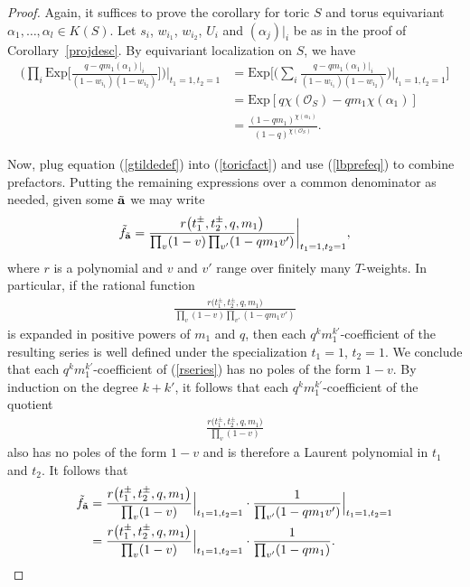 \documentclass[10pt,a4paper]{amsart}
\numberwithin{equation}{section}
\newcommand{\Exp}{\mathrm{Exp}}
\begin{document}
\begin{proof}
Again, it suffices to prove the corollary for toric $S$ and torus equivariant $\alpha_1,\dots,\alpha_l\in K(S)$. Let $s_i$, $w_{i_1}$, $w_{i_2}$, $U_i$ and $(\alpha_j)|_i$ be as in the proof of Corollary~\ref{projdesc}. By equivariant localization on $S$, we have \begin{align}\label{lbprefeq}
\nonumber\bigg(\prod_{i} \Exp\bigg [\frac{q-qm_1(\alpha_1)|_i}{(1-w_{i_1})(1-w_{i_2})}\bigg ] \bigg)\bigg |_{t_1=1,t_2=1}&=\Exp\bigg[\bigg(\sum_i \frac{q-qm_1(\alpha_1)|_i}{(1-w_{i_1})(1-w_{i_2})}\bigg)\bigg |_{t_1=1,t_2=1}\bigg ]
\\
&\nonumber=\Exp[q\chi(\mathcal{O}_S)-qm_1\chi(\alpha_1)]
\\
&=\frac{(1-qm_1)^{\chi(\alpha_1)}}{(1-q)^{\chi(\mathcal{O}_S)}}.
\end{align}

Now, plug equation (\ref{gtildedef}) into (\ref{toricfact}) and use (\ref{lbprefeq}) to combine prefactors. Putting the remaining expressions over a common denominator as needed, given some $\tilde{\bf{a}}$ we may write
\begin{gather*}
\tilde{f}_{\tilde{\bf{a}}}=\frac{r\big(t_1^{\pm}, t_2^{\pm},q,m_1\big)}{\prod_v (1-v)\prod_{v'} (1-qm_1v')}\bigg|_{t_1=1,t_2=1},
\end{gather*}
where $r$ is a polynomial and $v$ and $v'$ range over finitely many $T$-weights. In particular, if the rational function
\begin{align}\label{rseries}
\frac{r\big(t_1^{\pm}, t_2^{\pm},q,m_1\big)}{\prod_v (1-v)\prod_{v'} (1-qm_1v')}
\end{align}
is expanded in positive powers of $m_1$ and $q$, then each $q^{k}m_1^{k'}$-coefficient of the resulting series is well defined under the specialization $t_1=1$, $t_2=1$. We conclude that each $q^{k}m_1^{k'}$-coefficient of (\ref{rseries}) has no poles of the form $1-v$. By induction on the degree $k+k'$, it follows that each $q^{k}m_1^{k'}$-coefficient of the quotient
\begin{gather*}
\frac{r\big(t_1^{\pm}, t_2^{\pm},q,m_1\big)}{\prod_v (1-v)}
\end{gather*}
also has no poles of the form $1-v$ and is therefore a Laurent polynomial in $t_1$ and $t_2$. It follows that
\begin{align*}
\tilde{f}_{\tilde{\bf{a}}}&=\frac{r\big(t_1^{\pm}, t_2^{\pm},q,m_1\big)}{\prod_v (1-v)}\Big|_{t_1=1,t_2=1}\cdot \frac{1}{\prod_{v'} (1-qm_1v')}\Big|_{t_1=1,t_2=1}
\\
&=\frac{r\big(t_1^{\pm}, t_2^{\pm},q,m_1\big)}{\prod_v (1-v)}\Big|_{t_1=1,t_2=1}\cdot \frac{1}{\prod_{v'} (1-qm_1)}.\tag*{\qed}
\end{align*}
\renewcommand{\qed}{}
\end{proof}
\end{document}

